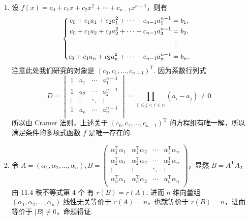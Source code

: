 \begin{enumerate}
    \item 设 $f(x) = c_0+c_1x+c_2x^2+\cdots+c_{n-1}x^{n-1}$，则有
          \[\begin{cases} \begin{aligned}
                      c_0+c_1a_1+c_2a_1^2+\cdots+c_{n-1}a_1^{n-1} & = b_1,            \\
                      c_0+c_1a_2+c_2a_2^2+\cdots+c_{n-1}a_2^{n-1} & = b_2,            \\
                                                                  & \vdotswithin{ = } \\
                      c_0+c_1a_n+c_2a_n^2+\cdots+c_{n-1}a_n^{n-1} & = b_n.            \\
                  \end{aligned} \end{cases}\]
          注意此处我们研究的对象是 $(c_0, c_1, \ldots, c_{n-1})^{\mathrm{T}}$. 因为系数行列式
          \[D = \begin{vmatrix}
                  1      & a_1    & \cdots & a_1^{n-1} \\
                  1      & a_2    & \cdots & a_2^{n-1} \\
                  \vdots & \vdots & \ddots & \vdots    \\
                  1      & a_n    & \cdots & a_n^{n-1} \\
              \end{vmatrix} = \prod_{1 \leqslant j < i \leqslant n} (a_i-a_j) \neq 0.\]
          所以由 Cramer 法则，上述关于 $(c_0, c_1, \ldots, c_{n-1})^{\mathrm{T}}$ 的方程组有唯一解，所以满足条件的多项式函数 $f$ 是唯一存在的.

    \item 令 $A = (\alpha_1, \alpha_2, \ldots, \alpha_n), B = \begin{pmatrix}
                  \alpha_1^{\mathrm{T}}\alpha_1 & \alpha_1^{\mathrm{T}}\alpha_2 & \cdots & \alpha_1^{\mathrm{T}}\alpha_n \\
                  \alpha_2^{\mathrm{T}}\alpha_1 & \alpha_2^{\mathrm{T}}\alpha_2 & \cdots & \alpha_2^{\mathrm{T}}\alpha_n \\
                  \vdots                        & \vdots                        & \ddots & \vdots                        \\
                  \alpha_n^{\mathrm{T}}\alpha_1 & \alpha_n^{\mathrm{T}}\alpha_2 & \cdots & \alpha_n^{\mathrm{T}}\alpha_n \\
              \end{pmatrix}$，显然 $B = A^{\mathrm{T}}A$，由 {11.4 秩不等式第 4 个} 有 $r(B) = r(A)$. 进而 $n$ 维向量组 $(\alpha_1, \alpha_2, \ldots, \alpha_n)$ 线性无关等价于 $r(A) = n$，也就等价于 $r(B) = n$，进而等价于 $\lvert B \rvert \neq 0$，命题得证. %


\end{enumerate}

